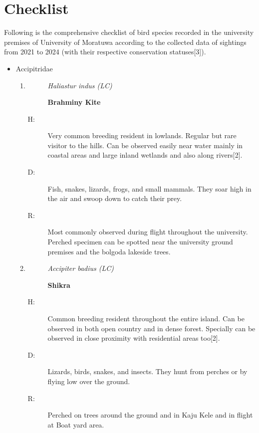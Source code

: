 \chapter{Checklist}
\label{cp:checklist}
Following is the comprehensive checklist of bird species recorded in the university premises of University of Moratuwa according to the collected data of sightings from 2021 to 2024 (with their respective conservation statuses[3]).

\begin{itemize}%
\item%
 Accipitridae%
\begin{enumerate}%
\item%
\begin{description}%
\item[]%
\textit{Haliastur indus (LC)}%
\item[]%
\textbf{Brahminy Kite}%
\end{description}%
\begin{description}%
\item[H: ]%
Very common breeding resident in lowlands. Regular but rare visitor to the hills. Can be observed easily near water mainly in coastal areas and large inland wetlands and also along rivers{[}2{]}.%
\item[D: ]%
Fish, snakes, lizards, frogs, and small mammals. They soar high in the air and swoop down to catch their prey.%
\item[R: ]%
Most commonly observed during flight throughout the university. Perched specimen can be spotted near the university ground premises and the bolgoda lakeside trees.%
\end{description}%
\item%
\begin{description}%
\item[]%
\textit{Accipiter badius (LC)}%
\item[]%
\textbf{Shikra}%
\end{description}%
\begin{description}%
\item[H: ]%
Common breeding resident throughout the entire island. Can be observed in both open country and in dense forest. Specially can be observed in close proximity with residential areas too{[}2{]}.%
\item[D: ]%
 Lizards, birds, snakes, and insects. They hunt from perches or by flying low over the ground.%
\item[R: ]%
Perched on trees around the ground and in Kaju Kele and in flight at Boat yard area.%

\end{description}
\end{enumerate}
\end{itemize}

